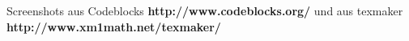  Screenshots aus Codeblocks \textbf{http://www.codeblocks.org/} und aus texmaker \textbf{http://www.xm1math.net/texmaker/}